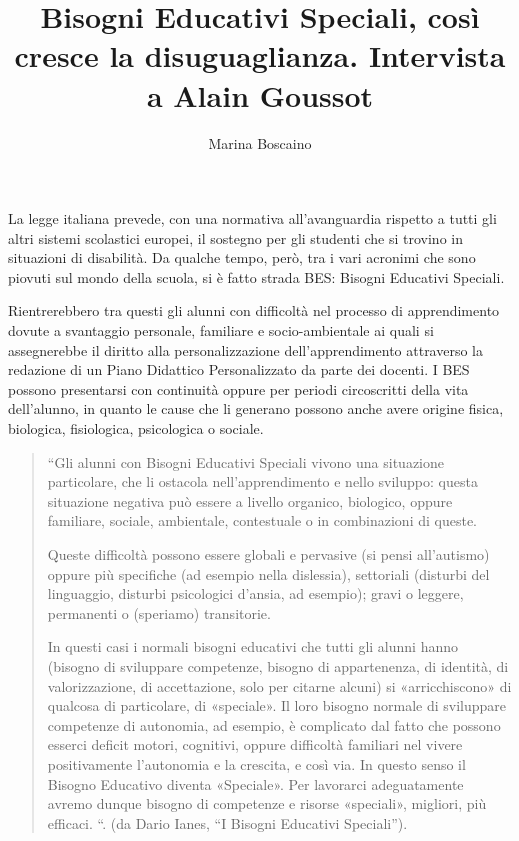 \author{Marina Boscaino}
\title{Bisogni Educativi Speciali, così cresce la disuguaglianza. Intervista a Alain Goussot}
\label{cha:Boscaiono261113}
\maketitle
{}
La legge italiana prevede, con una normativa all'avanguardia rispetto a tutti gli altri sistemi scolastici europei, il sostegno per gli studenti che si trovino in situazioni di disabilità. Da qualche tempo, però, tra i vari acronimi che sono piovuti sul mondo della scuola, si è fatto strada BES: Bisogni Educativi Speciali.

Rientrerebbero tra questi gli alunni con difficoltà nel processo di apprendimento dovute a svantaggio personale, familiare e socio-ambientale ai quali si assegnerebbe il diritto alla personalizzazione dell'apprendimento attraverso la redazione di un Piano Didattico Personalizzato da parte dei docenti. I BES possono presentarsi con continuità oppure per periodi circoscritti della vita dell'alunno, in quanto le cause che li generano possono anche avere origine fisica, biologica, fisiologica, psicologica o sociale.
\begin{quote}
“Gli alunni con Bisogni Educativi Speciali vivono una situazione particolare, che li ostacola nell'apprendimento e nello sviluppo: questa situazione negativa può essere a livello organico, biologico, oppure familiare, sociale, ambientale, contestuale o in combinazioni di queste. \mancatesto

Queste difficoltà possono essere globali e pervasive (si pensi all'autismo) oppure più specifiche (ad esempio nella dislessia), settoriali (disturbi del linguaggio, disturbi psicologici d'ansia, ad esempio); gravi o leggere, permanenti o (speriamo) transitorie.

In questi casi i normali bisogni educativi che tutti gli alunni hanno (bisogno di sviluppare competenze, bisogno di appartenenza, di identità, di valorizzazione, di accettazione, solo per citarne alcuni) si «arricchiscono» di qualcosa di particolare, di «speciale». Il loro bisogno normale di sviluppare competenze di autonomia, ad esempio, è complicato dal fatto che possono esserci deficit motori, cognitivi, oppure difficoltà familiari nel vivere positivamente l'autonomia e la crescita, e così via. In questo senso il Bisogno Educativo diventa «Speciale». Per lavorarci adeguatamente avremo dunque bisogno di competenze e risorse «speciali», migliori, più efficaci. \mancatesto“. (da Dario Ianes, “I Bisogni Educativi Speciali”).
\end{quote}

